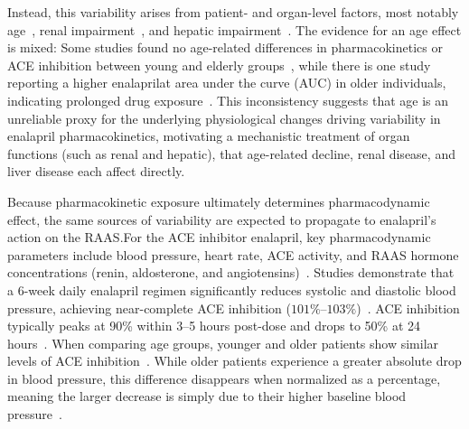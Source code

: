 \documentclass[pharmaceutics,article,submit,pdftex,moreauthors]{Definitions/mdpi}
\begin{document}
Instead, this variability arises from patient- and organ-level factors, most notably age~\cite{Hockings1986, Lees1987a, MacDonald1993}, renal impairment~\cite{Fruncillo1987, Kelly1986, Lowenthal1984}, and hepatic impairment~\cite{Baba1990, Ohnishi1989}. The evidence for an age effect is mixed: Some studies found no age-related differences in pharmacokinetics or ACE inhibition between young and elderly groups~\cite{Hockings1986, Lees1987a}, while there is one study reporting a higher enalaprilat area under the curve (AUC) in older individuals, indicating prolonged drug exposure~\cite{MacDonald1993}. This inconsistency suggests that age is an unreliable proxy for the underlying physiological changes driving variability in enalapril pharmacokinetics, motivating a mechanistic treatment of organ functions (such as renal and hepatic), that age-related decline, renal disease, and liver disease each affect directly.

Because pharmacokinetic exposure ultimately determines pharmacodynamic effect, the same sources of variability are expected to propagate to enalapril's action on the RAAS.\@ For the ACE inhibitor enalapril, key pharmacodynamic parameters include blood pressure, heart rate, ACE activity, and RAAS hormone concentrations (renin, aldosterone, and angiotensins)~\cite{Donnelly1987, Lees1987a, Ribeiro1996, Shionoiri1985}. Studies demonstrate that a 6-week daily enalapril regimen significantly reduces systolic and diastolic blood pressure, achieving near-complete ACE inhibition (\(101\%\)--\(103\%\))~\cite{Donnelly1990}. ACE inhibition typically peaks at 90\% within 3--5 hours post-dose and drops to 50\% at 24 hours~\cite{Ribeiro1996}. When comparing age groups, younger and older patients show similar levels of ACE inhibition~\cite{Lees1987a}. While older patients experience a greater absolute drop in blood pressure, this difference disappears when normalized as a percentage, meaning the larger decrease is simply due to their higher baseline blood pressure~\cite{Lees1987a}.
\end{document}

